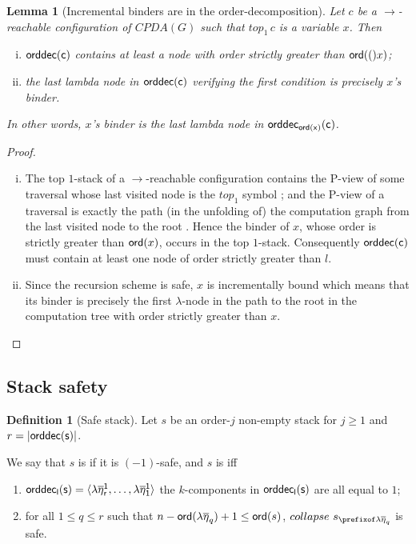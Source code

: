 \documentclass[a4paper]{article}
\newtheorem{lemma}{Lemma}[section]
\theoremstyle{remark}
\theoremstyle{definition}
\newtheorem{definition}{Definition}[section]
\newcommand\orddec{\sf orddec}
\begin{document}
\begin{lemma}[Incremental binders are in the order-decomposition]
\label{lem:binder_in_ordecompos} Let $c$ be a $\rightarrow$-reachable
configuration of $CPDA(G)$ such that $top_1\,c$ is a variable $x$. Then
\begin{enumerate}[i.]
\item $\orddec(c)$ contains at least a node with order strictly greater than ${\sf ord}(()x)$;
\item the last lambda node in $\orddec(c)$ verifying the first condition is precisely $x$'s binder.
\end{enumerate}
In other words, $x$'s binder is the last lambda node in $\orddec_{\ord x}(c)$.
\end{lemma}
\begin{proof}
\begin{enumerate}[i.]
\item The top $1$-stack of a $\rightarrow$-reachable configuration contains the P-view of some traversal whose last visited node is the $top_1$ symbol \cite[Corollary 8]{hague-collaps-full}; and
    the P-view of a traversal is exactly the path (in the unfolding of) the
    computation graph from the last visited node to
    the root \cite[Proposition 6]{OngLics2006}. Hence the binder of $x$, whose order
    is strictly greater than ${\sf ord}(x)$, occurs in the top $1$-stack.
    Consequently $\orddec(c)$ must contain at least one node of order strictly greater than $l$.

\item Since the recursion scheme is safe, $x$ is
 incrementally bound \cite{blumong:safelambdacalculus}
 which means that its binder is precisely the first $\lambda$-node in the
 path to the root in the computation tree with order strictly
 greater than $x$. \qedhere
\end{enumerate}
\end{proof}

\subsection{Stack safety}

\begin{definition}[Safe stack]
\label{dfn:safestack} Let $s$ be an order-$j$ non-empty stack for $j\geq1$ and $r
= |\orddec(s)|$.

We say that $s$ is  if it is $(-1)$-safe,
and $s$ is  iff
    \begin{enumerate}[1.]
    \item $\orddec_l(s) = \langle \lambda \overline\eta_r^1, \ldots ,
    \lambda \overline{\eta}_1^1 \rangle$ \ie the $k$-components in $\orddec_l(s)$ are all equal to $1$;

    \item for all $1 \leq q \leq r$ such that $n-{\sf ord}(\lambda \overline\eta_q)+1 \leq {\sf ord}(s)$,
    $collapse~s_{\prefixof \lambda\overline\eta_q}$ is safe.
    \end{enumerate}

\end{definition}
\end{document}
